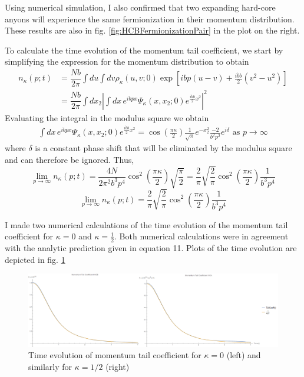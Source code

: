 \documentclass[onecolumn,english,aps,pra]{revtex4}
\begin{document}
Using numerical simulation, I also confirmed that two expanding hard-core anyons will experience the same fermionization in their momentum distribution. These results are also in fig. \ref{fig:HCBFermionizationPair} in the plot on the right.

To calculate the time evolution of the momentum tail coefficient, we start by simplifying the expression for the momentum distribution to obtain
\begin{align*}
n_{\kappa}(p ; t) & = \dfrac{N b}{2\pi} \int du \int dv 
\rho_{\kappa}(u, v; 0)
\exp \left[ibp(u - v) +	 \frac{i \dot{b}b}{2 } (v^2 - u^2) \right]\\
& = \dfrac{N b}{2\pi} \int dx_{2} \left| \int dx \, e^{ibpx} \Psi_{\kappa}(x, x_{2}; 0) e^{\frac{i \dot{b}b}{2} x^2}\right|^2
\end{align*}
%
Evaluating the integral in the modulus square we obtain
%
\begin{align*}
\int dx \, e^{ibpx} \Psi_{\kappa}(x, x_{2}; 0) e^{\frac{i \dot{b}b}{2} x^2} 
= \cos\left(\frac{\pi \kappa}{2}\right) 
\frac{1}{\sqrt{\pi}} e^{- x_{2}^2} \frac{-2}{b^2 p^2} e^{i \delta} 
\text{	as } p \rightarrow \infty 
\end{align*}
where $\delta$ is a constant phase shift that will be eliminated by the modulus square and can therefore be ignored. Thus,
\[
\lim_{p \rightarrow \infty} n_{\kappa}(p ; t) = 
\frac{4N}{2 \pi^2 b^3 p^4} \cos^2\left(\frac{\pi \kappa}{2}\right) \sqrt{\frac{\pi}{2}}
= \frac{2}{\pi} \sqrt{\frac{2}{\pi}} \cos^2\left(\frac{\pi \kappa}{2}\right) \frac{1}{b^3 p^4}
\]
\begin{equation}
\lim_{p \rightarrow \infty} n_{\kappa}(p ; t) = 
\frac{2}{\pi} \sqrt{\frac{2}{\pi}} \cos^2\left(\frac{\pi \kappa}{2}\right) \frac{1}{b^3 p^4}
\label{MomentumTail}
\end{equation}

I made two numerical calculations of the time evolution of the momentum tail coefficient for $\kappa = 0$ and $\kappa = \frac{1}{2}$. Both numerical calculations were in agreement with the analytic prediction given in equation 11. Plots of the time evolution are depicted in fig. \ref{fig:HCATimeDepPair}
%
\begin{center}
\begin{figure}[h]
	\includegraphics[scale=.44]{"../Plots/MomTailCoeffTimeDepRow"}
	\caption{Time evolution of momentum tail coefficient for $\kappa = 0$ (left) and similarly for $\kappa = 1/2$ (right)} 
	\label{fig:HCATimeDepPair}
\end{figure}
\end{center}
%
\end{document}
